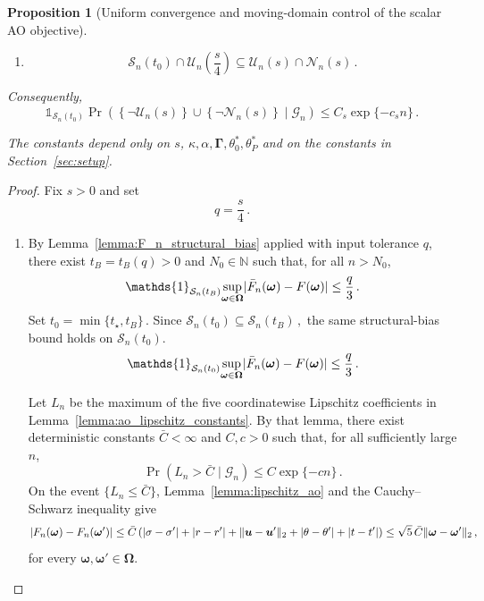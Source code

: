 \documentclass{article}
\makeatletter
\newtheorem{proposition}[theorem]{Proposition}
\theoremstyle{definition}
\newcommand{\vnorm}[1]{%
	\ensuremath{%
		\if@display
		\left\| #1 \right\|
		\else
		\| #1 \|
		\fi
	}%
}
\newcommand{\abs}[1]{%
	\ensuremath{%
		\if@display
		\left| #1 \right|
		\else
		\lvert #1 \rvert
		\fi
	}%
}
\newcommand*{\bb}{\boldsymbol}
\def\bu{\bb{u}}
\makeatother
\begin{document}
\begin{bibunit}
\begin{proposition}[Uniform convergence and moving-domain control of the scalar AO objective]
\begin{enumerate}[label=(\roman*)]
	\item
	\begin{equation}
	\label{eq:uniform_AO_domain_inclusion}
		\mathcal S_n(t_0)
		\cap
		\mathcal U_n\left(\frac{s}{4}\right)
		\subseteq
		\mathcal U_n(s)
		\cap
		\mathcal N_n(s)\,.
	\end{equation}
\end{enumerate}
Consequently,
\begin{equation}
\label{eq:uniform_AO_joint_conditional}
	\mathds{1}_{\mathcal S_n(t_0)}
	\Pr\left(
		\left\{\lnot\mathcal U_n(s)\right\}
		\cup
		\left\{\lnot\mathcal N_n(s)\right\}
		\mid
		\mathcal G_n
	\right)
	\leq
	C_s\exp\{-c_sn\}\,.
\end{equation}

The constants depend only on $s$, $\kappa,\alpha,\bb\Gamma,\theta_0^*,\theta_P^*$
and on the constants in Section~\ref{sec:setup}.
\end{proposition}

\begin{proof}
	Fix $s>0$ and set
	$$
		q=\frac{s}{4}\,.
	$$
	\begin{enumerate}[label=(\roman*)]
	\item
	By Lemma~\ref{lemma:F_n_structural_bias} applied with input tolerance
	$q$, there exist $t_B=t_B(q)>0$ and $N_0\in\mathbb N$ such that, for
	all $n>N_0$,
	$$
		\mathds{1}_{\mathcal S_n(t_B)}
		\underset{\bb\omega\in\bb\Omega}{\sup}
		\abs{
			\bar F_n(\bb\omega)-F(\bb\omega)
		}
		\leq
		\frac{q}{3}\,.
	$$
	Set $t_0 = \min\{t_\star,t_B\}\,.$
	Since $\mathcal S_n(t_0) \subseteq \mathcal S_n(t_B)\,,$
	the same structural-bias bound holds on $\mathcal S_n(t_0)$.
	\begin{equation}
		\label{eq:uniform_AO_bias_bound}
		\mathds{1}_{\mathcal S_n(t_0)}
		\underset{\bb\omega\in\bb\Omega}{\sup}
		\abs{
			\bar F_n(\bb\omega)-F(\bb\omega)
		}
		\leq
		\frac{q}{3}\,.
	\end{equation}

	Let $L_n$ be the maximum of the five coordinatewise Lipschitz
	coefficients in Lemma~\ref{lemma:ao_lipschitz_constants}. By that
	lemma, there exist deterministic constants $\bar C<\infty$ and
	$C,c>0$ such that, for all sufficiently large $n$,
	\begin{equation}
		\label{eq:uniform_AO_Lipschitz_event}
		\Pr\left(
			L_n>\bar C
			\mid
			\mathcal G_n
		\right)
		\leq
		C\exp\{-cn\}\,.
	\end{equation}
	On the event $\{L_n\leq\bar C\}$,
	Lemma~\ref{lemma:lipschitz_ao} and the Cauchy--Schwarz inequality \citep[Theorem~1.37(d)]{rudin+etal:1976} give
	$$
		\abs{ F_n(\bb\omega)-F_n(\bb\omega') } \leq \bar C \left( \abs{\sigma-\sigma'} + \abs{r-r'} + \vnorm{\bu-\bu'}_2 + \abs{\theta-\theta'} + \abs{t-t'} \right) \leq \sqrt{5}\,\bar C \vnorm{ \bb\omega-\bb\omega' }_2\,,
	$$
	for every $\bb\omega,\bb\omega'\in\bb\Omega$.


\end{enumerate}
\end{proof}
\end{bibunit}
\end{document}
